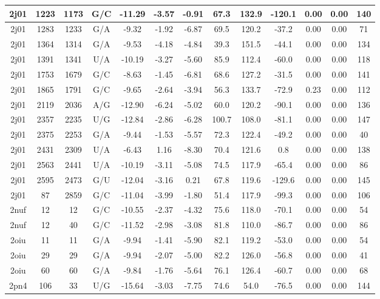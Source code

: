 {\begin{center}
\begin{longtable}{|c|c|c|c|c|c|c|c|c|c|c|c|c|}
2j01 & 1223 & 1173 & G/C & -11.29 & -3.57 & -0.91 & 67.3 & 132.9 & -120.1 & 0.00 & 0.00 & 140 \\ \hline
2j01 & 1283 & 1233 & G/A & -9.32 & -1.92 & -6.87 & 69.5 & 120.2 & -37.2 & 0.00 & 0.00 & 71 \\ \hline
2j01 & 1364 & 1314 & G/A & -9.53 & -4.18 & -4.84 & 39.3 & 151.5 & -44.1 & 0.00 & 0.00 & 134 \\ \hline
2j01 & 1391 & 1341 & U/A & -10.19 & -3.27 & -5.60 & 85.9 & 112.4 & -60.0 & 0.00 & 0.00 & 118 \\ \hline
2j01 & 1753 & 1679 & G/C & -8.63 & -1.45 & -6.81 & 68.6 & 127.2 & -31.5 & 0.00 & 0.00 & 141 \\ \hline
2j01 & 1865 & 1791 & G/C & -9.65 & -2.64 & -3.94 & 56.3 & 133.7 & -72.9 & 0.23 & 0.00 & 112 \\ \hline
2j01 & 2119 & 2036 & A/G & -12.90 & -6.24 & -5.02 & 60.0 & 120.2 & -90.1 & 0.00 & 0.00 & 136 \\ \hline
2j01 & 2357 & 2235 & U/G & -12.84 & -2.86 & -6.28 & 100.7 & 108.0 & -81.1 & 0.00 & 0.00 & 147 \\ \hline
2j01 & 2375 & 2253 & G/A & -9.44 & -1.53 & -5.57 & 72.3 & 122.4 & -49.2 & 0.00 & 0.00 & 40 \\ \hline
2j01 & 2431 & 2309 & U/A & -6.43 & 1.16 & -8.30 & 70.4 & 121.6 & 0.8 & 0.00 & 0.00 & 138 \\ \hline
2j01 & 2563 & 2441 & U/A & -10.19 & -3.11 & -5.08 & 74.5 & 117.9 & -65.4 & 0.00 & 0.00 & 86 \\ \hline
2j01 & 2595 & 2473 & G/U & -12.04 & -3.16 & 0.21 & 67.8 & 119.6 & -129.6 & 0.00 & 0.00 & 145 \\ \hline
2j01 & 87 & 2859 & G/C & -11.04 & -3.99 & -1.80 & 51.4 & 117.9 & -99.3 & 0.00 & 0.00 & 106 \\ \hline
2nuf & 12 & 12 & G/C & -10.55 & -2.37 & -4.32 & 75.6 & 118.0 & -70.1 & 0.00 & 0.00 & 54 \\ \hline
2nuf & 12 & 40 & G/C & -11.52 & -2.98 & -3.08 & 81.8 & 110.0 & -86.7 & 0.00 & 0.00 & 86 \\ \hline
2oiu & 11 & 11 & G/A & -9.94 & -1.41 & -5.90 & 82.1 & 119.2 & -53.0 & 0.00 & 0.00 & 54 \\ \hline
2oiu & 29 & 29 & G/A & -9.94 & -2.07 & -5.00 & 82.2 & 126.0 & -56.8 & 0.00 & 0.00 & 41 \\ \hline
2oiu & 60 & 60 & G/A & -9.84 & -1.76 & -5.64 & 76.1 & 126.4 & -60.7 & 0.00 & 0.00 & 68 \\ \hline
2pn4 & 106 & 33 & U/G & -15.64 & -3.03 & -7.75 & 74.6 & 54.0 & -76.5 & 0.00 & 0.00 & 144 \\ \hline

\end{longtable}
\end{center}}
